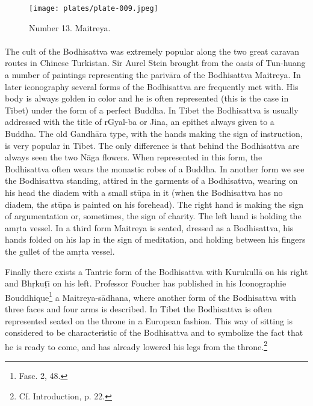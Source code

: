 \documentclass[a4paper, 12pt, oneside]{article}
\begin{document}
\clearpage
\vspace*{\fill}
\begin{figure}[H]
\centering
\texttt{[image: plates/plate-009.jpeg]}
\caption*{Number 13. Maitreya.}
\end{figure}
\vspace*{\fill}
\clearpage
\paragraph{}
The cult of the Bodhisattva was extremely popular along the two great caravan routes in Chinese Turkistan. Sir Aurel Stein brought from the oasis of Tun-huang a number of paintings representing the pariv\={a}ra of the Bodhisattva Maitreya. In later iconography several forms of the Bodhisattva are frequently met with. His body is always golden in color and he is often represented (this is the case in Tibet) under the form of a perfect Buddha. In Tibet the Bodhisattva is usually addressed with the title of rGyal-ba or Jina, an epithet always given to a Buddha. The old Gandh\={a}ra type, with the hands making the sign of instruction, is very popular in Tibet. The only difference is that behind the Bodhisattva are always seen the two N\={a}ga flowers. When represented in this form, the Bodhisattva often wears the monastic robes of a Buddha. In another form we see the Bodhisattva standing, attired in the garments of a Bodhisattva, wearing on his head the diadem with a small st\={u}pa in it (when the Bodhisattva has no diadem, the st\={u}pa is painted on his forehead). The right hand is making the sign of argumentation or, sometimes, the sign of charity. The left hand is holding the am\d{r}ta vessel. In a third form Maitreya is seated, dressed as a Bodhisattva, his hands folded on his lap in the sign of meditation, and holding between his fingers the gullet of the am\d{r}ta vessel.

Finally there exists a Tantric form of the Bodhisattva with Kurukull\={a} on his right and Bh\d{r}ku\d{t}\={\i} on his left. Professor Foucher has published in his Iconographie Bouddhique\footnote{Fasc. 2, 48.} a Maitreya-s\={a}dhana, where another form of the Bodhisattva with three faces and four arms is described. In Tibet the Bodhisattva is often represented seated on the throne in a European fashion. This way of sitting is considered to be characteristic of the Bodhisattva and to symbolize the fact that he is ready to come, and has already lowered his legs from the throne.\footnote{Cf. Introduction, p. 22.}
\end{document}
